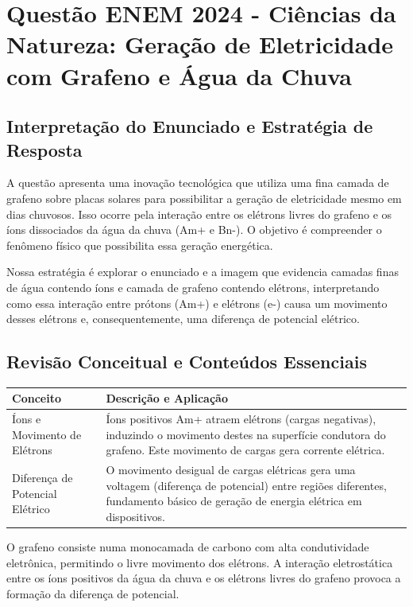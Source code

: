 \documentclass{article}
\begin{document}
\section*{Questão ENEM 2024 - Ciências da Natureza: Geração de Eletricidade com Grafeno e Água da Chuva}

\subsection*{Interpretação do Enunciado e Estratégia de Resposta}

A questão apresenta uma inovação tecnológica que utiliza uma fina camada de grafeno sobre placas solares para possibilitar a geração de eletricidade mesmo em dias chuvosos. Isso ocorre pela interação entre os elétrons livres do grafeno e os íons dissociados da água da chuva (Am+ e Bn-). O objetivo é compreender o fenômeno físico que possibilita essa geração energética.

Nossa estratégia é explorar o enunciado e a imagem que evidencia camadas finas de água contendo íons e camada de grafeno contendo elétrons, interpretando como essa interação entre prótons (Am+) e elétrons (e-) causa um movimento desses elétrons e, consequentemente, uma diferença de potencial elétrico.

\bigskip

\subsection*{Revisão Conceitual e Conteúdos Essenciais}

\begin{tabular}{p{6cm} p{10cm}}
\textbf{Conceito} & \textbf{Descrição e Aplicação} \\
\hline
Íons e Movimento de Elétrons & Íons positivos Am+ atraem elétrons (cargas negativas), induzindo o movimento destes na superfície condutora do grafeno. Este movimento de cargas gera corrente elétrica.\\
Diferença de Potencial Elétrico & O movimento desigual de cargas elétricas gera uma voltagem (diferença de potencial) entre regiões diferentes, fundamento básico de geração de energia elétrica em dispositivos.\\
\end{tabular}

\bigskip

\noindent O grafeno consiste numa monocamada de carbono com alta condutividade eletrônica, permitindo o livre movimento dos elétrons. A interação eletrostática entre os íons positivos da água da chuva e os elétrons livres do grafeno provoca a formação da diferença de potencial.
\end{document}
